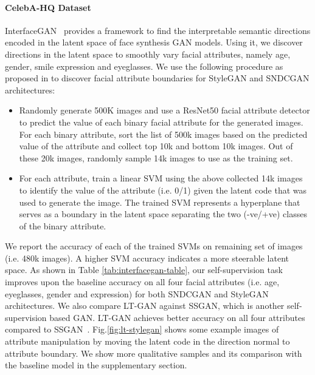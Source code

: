 \documentclass[10pt,twocolumn,letterpaper]{article}
\begin{document}
\paragraph{CelebA-HQ Dataset}\label{sec:steer}
InterfaceGAN~\cite{interface2020shen} provides 
a framework to find the interpretable semantic directions encoded in the latent space of face synthesis GAN models. Using it, we discover directions in the latent space to smoothly vary facial attributes, namely age, gender, smile expression and eyeglasses. We use the following procedure as proposed in \cite{interface2020shen} to discover facial attribute boundaries for StyleGAN and SNDCGAN architectures:
\begin{itemize}
  \item Randomly generate 500K images and use a ResNet50 facial attribute detector to predict the value of each binary facial attribute for the generated images. For each binary attribute, sort the list of 500k images based on the predicted value of the attribute and collect top 10k and bottom 10k images. Out of these 20k images, randomly sample 14k images to use as the training set.
  \item For each attribute, train a linear SVM using the above collected 14k images to identify the value of the attribute (i.e. 0/1) given the latent code that was used to generate the image. The trained SVM represents a hyperplane that serves as a boundary in the latent space separating the two (-ve/+ve) classes of the binary attribute.
\end{itemize}
\par
We report the accuracy of each of the trained SVMs on remaining set of images (i.e. 480k images). A higher SVM accuracy indicates a more steerable latent space. As shown in Table \ref{tab:interfacegan-table}, our self-supervision task improves upon the baseline accuracy on all four facial attributes (i.e. age, eyeglasses, gender and expression) for both SNDCGAN and StyleGAN architectures. We also compare LT-GAN against SSGAN, which is another self-supervision based GAN. LT-GAN achieves better accuracy on all four attributes compared to SSGAN~\cite{rot_ssgan2019chen}. Fig.\ref{fig:lt-stylegan} shows some example images of attribute manipulation by moving the latent code in the direction normal to attribute boundary. We show more qualitative samples and its comparison with the baseline model in the supplementary section. 
\end{document}
